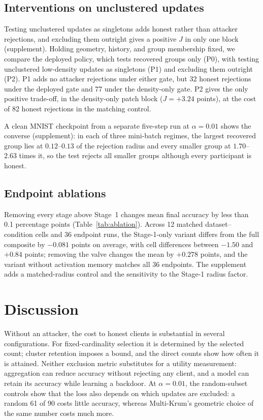 \documentclass[journal]{IEEEtran}
\begin{document}
\subsection{Interventions on unclustered updates}
Testing unclustered updates as singletons adds honest rather than attacker rejections, and excluding them outright gives a positive $J$ in only one block (supplement). Holding geometry, history, and group membership fixed, we compare the deployed policy, which tests recovered groups only (P0), with testing unclustered low-density updates as singletons (P1) and excluding them outright (P2). P1 adds no attacker rejections under either gate, but 32 honest rejections under the deployed gate and 77 under the density-only gate. P2 gives the only positive trade-off, in the density-only patch block ($J=+3.24$ points), at the cost of 82 honest rejections in the matching control.

A clean MNIST checkpoint from a separate five-step run at $\alpha=0.01$ shows the converse (supplement): in each of three mini-batch regimes, the largest recovered group lies at $0.12$--$0.13$ of the rejection radius and every smaller group at $1.70$--$2.63$ times it, so the test rejects all smaller groups although every participant is honest.

\subsection{Endpoint ablations}

Removing every stage above Stage~1 changes mean final accuracy by less than 0.1 percentage points (Table~\ref{tab:ablation}). Across 12 matched dataset--condition cells and 36 endpoint runs, the Stage-1-only variant differs from the full composite by $-0.081$ points on average, with cell differences between $-1.50$ and $+0.84$ points; removing the valve changes the mean by $+0.278$ points, and the variant without activation memory matches all 36 endpoints. The supplement adds a matched-radius control and the sensitivity to the Stage-1 radius factor.

\section{Discussion}\label{sec:discussion}
Without an attacker, the cost to honest clients is substantial in several configurations. For fixed-cardinality selection it is determined by the selected count; cluster retention imposes a bound, and the direct counts show how often it is attained. Neither exclusion metric substitutes for a utility measurement: aggregation can reduce accuracy without rejecting any client, and a model can retain its accuracy while learning a backdoor. At $\alpha=0.01$, the random-subset controls show that the loss also depends on which updates are excluded: a random 61 of 90 costs little accuracy, whereas Multi-Krum's geometric choice of the same number costs much more.
\end{document}
